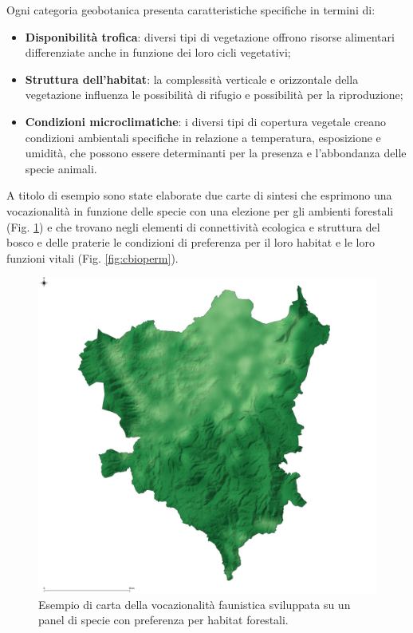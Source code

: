 \documentclass[
  a4paper,
]{book}
\begin{document}
Ogni categoria geobotanica presenta caratteristiche specifiche in termini di:

\begin{itemize}
\item
  \textbf{Disponibilità trofica}: diversi tipi di vegetazione offrono risorse alimentari differenziate anche in funzione dei loro cicli vegetativi;
\item
  \textbf{Struttura dell'habitat}: la complessità verticale e orizzontale della vegetazione influenza le possibilità di rifugio e possibilità per la riproduzione;
\item
  \textbf{Condizioni microclimatiche}: i diversi tipi di copertura vegetale creano condizioni ambientali specifiche in relazione a temperatura, esposizione e umidità, che possono essere determinanti per la presenza e l'abbondanza delle specie animali.
\end{itemize}

A titolo di esempio sono state elaborate due carte di sintesi che esprimono una vocazionalità in funzione delle specie con una elezione per gli ambienti forestali (Fig. \ref{fig:cidon}) e che trovano negli elementi di connettività ecologica e struttura del bosco e delle praterie le condizioni di preferenza per il loro habitat e le loro funzioni vitali (Fig. \ref{fig:cbioperm}).

\begin{figure}

{\centering \includegraphics[width=1\linewidth]{./figs/cartaIdoneita} 

}

\caption{Esempio di carta della vocazionalità faunistica sviluppata su un panel di specie con preferenza per habitat forestali.}\label{fig:cidon}
\end{figure}
\end{document}
